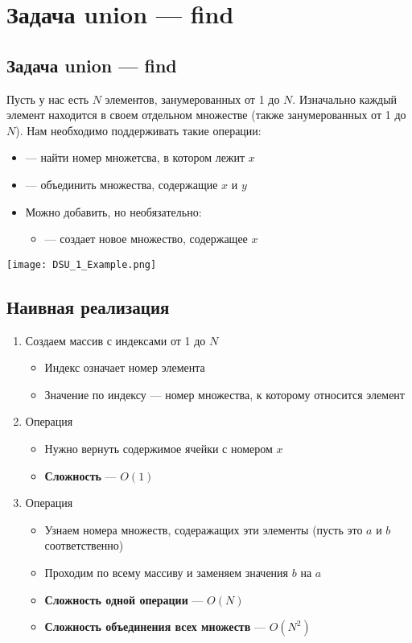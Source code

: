 \documentclass[a4paper]{article}
\begin{document}
\section{Задача union — find}
\subsection{Задача union — find}
Пусть у нас есть $N$ элементов, занумерованных от 1 до $N$. Изначально каждый элемент находится в своем отдельном множестве (также занумерованных от 1 до $N$). Нам необходимо поддерживать такие операции:
\begin{itemize}
    \item {} — найти номер множетсва, в котором лежит $x$
    \item {} — объединить множества, содержащие $x$ и $y$
    \item Можно добавить, но необязательно:
    \begin{itemize}
        \item {} — создает новое множество, содержащее $x$ 
    \end{itemize}
\end{itemize}
\begin{center}
    \texttt{[image: DSU\_1\_Example.png]}
    \label{union-find}
\end{center}

\subsection{Наивная реализация}
\begin{enumerate}
    \item Создаем массив с индексами от 1 до $N$
    \begin{itemize}
        \item Индекс означает номер элемента
        \item Значение по индексу — номер множества, к которому относится элемент
    \end{itemize}
    \item Операция 
    \begin{itemize}
        \item Нужно вернуть содержимое ячейки с номером $x$
        \item \textbf{Сложность} — $O(1)$
    \end{itemize}
    \item Операция 
    \begin{itemize}
        \item Узнаем номера множеств, содеражащих эти элементы (пусть это $a$ и $b$ соответственно)
        \item Проходим по всему массиву и заменяем значения $b$ на $a$
        \item \textbf{Сложность одной операции} — $O(N)$
        \item \textbf{Сложность объединения всех множеств} — $O(N^2)$
    \end{itemize}
\end{enumerate}
\end{document}
